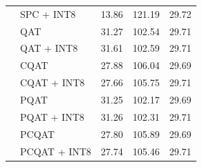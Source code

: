 \begin{table}[htbp]
{\begin{tabular}{llrrr}
  & SPC + INT8 & 13.86 & 121.19 & 29.72 \\
  & QAT & 31.27 & 102.54 & 29.71 \\
  & QAT + INT8 & 31.61 & 102.59 & 29.71 \\
  & CQAT & 27.88 & 106.04 & 29.69 \\
  & CQAT + INT8 & 27.66 & 105.75 & 29.71 \\
  & PQAT & 31.25 & 102.17 & 29.69 \\
  & PQAT + INT8 & 31.26 & 102.31 & 29.71 \\
  & PCQAT & 27.80 & 105.89 & 29.69 \\
  & PCQAT + INT8 & 27.74 & 105.46 & 29.71 \\
\bottomrule
\end{tabular}%
}
\end{table}